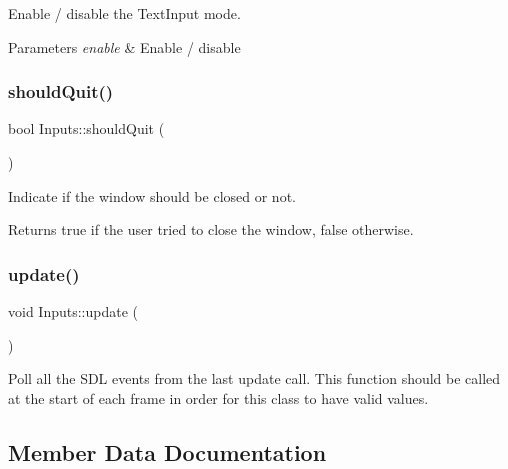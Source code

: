 Enable / disable the Text\+Input mode. 


\begin{DoxyParams}{Parameters}
{\em enable} & Enable / disable \\
\hline
\end{DoxyParams}
\mbox{\label{class_inputs_a3844589a1c88f346f5daae1d2088748f}} 
\subsubsection{\texorpdfstring{should\+Quit()}{shouldQuit()}}
{\footnotesize\ttfamily bool Inputs\+::should\+Quit (\begin{DoxyParamCaption}{ }\end{DoxyParamCaption})\hspace{0.3cm}{\ttfamily [static]}}

Indicate if the window should be closed or not.

\begin{DoxyReturn}{Returns}
true if the user tried to close the window, false otherwise. 
\end{DoxyReturn}
\mbox{\label{class_inputs_a7765edb8008e1c3f7ea67e2aa77eb885}} 
\subsubsection{\texorpdfstring{update()}{update()}}
{\footnotesize\ttfamily void Inputs\+::update (\begin{DoxyParamCaption}{ }\end{DoxyParamCaption})\hspace{0.3cm}{\ttfamily [static]}}

Poll all the S\+DL events from the last update call. This function should be called at the start of each frame in order for this class to have valid values. 

\subsection{Member Data Documentation}
\mbox{\label{class_inputs_a22d4d9653fea3d145cbcfc3b91d49b84}} 
